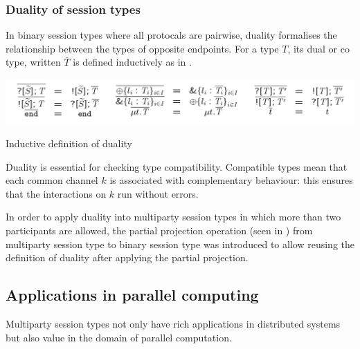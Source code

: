 \subsubsection{Duality of session types}
In binary session types where all protocals are pairwise, duality formalises the relationship between the types of opposite endpoints. For a type $T$, its dual or co type, written $\bar{T}$ is defined inductively as in .
\begin{table}[H]
\includegraphics[width=\textwidth]{background/image/dual-def.png}
\caption{Inductive definition of duality}
\label{b:mpst:dualdef}
\end{table}

Duality is essential for checking type compatibility. Compatible types mean that each common channel $k$ is associated with complementary behaviour: this ensures that the interactions on $k$ run without errors. 

In order to apply duality into multiparty session types in which more than two participants are allowed, the partial projection operation (seen in \cite{coppoGentleIntroductionMultiparty2015}) from multiparty session type to binary session type was introduced to allow reusing the definition of duality after applying the partial projection.
\subsection{Applications in parallel computing} \label{b:mpst:app}
Multiparty session types not only have rich applications in distributed systems but also value in the domain of parallel computation. 

